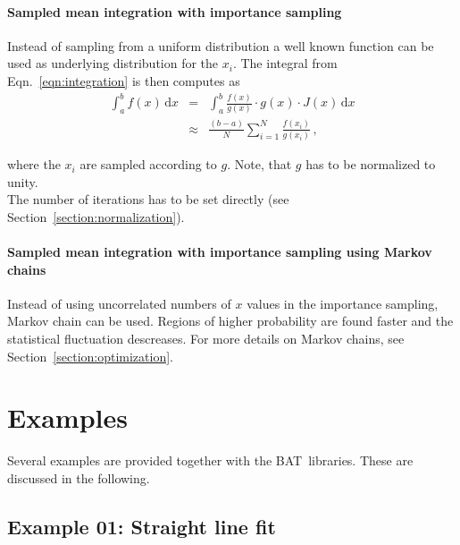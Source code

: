 \documentclass[11pt, a4paper]{article}
\newcommand{\BAT}{{\sc BAT}}
\begin{document}
\paragraph{Sampled mean integration with importance sampling} 

Instead of sampling from a uniform distribution a well known function
can be used as underlying distribution for the $x_{i}$. The integral
from Eqn.~\ref{eqn:integration} is then computes as 
%
\begin{eqnarray}
\int_{a}^{b} f(x) \, \mathrm{d}x & = & \int_{a}^{b} \frac{f(x)}{g(x)} \cdot g(x) \cdot J(x) \, \mathrm{d}x \\ 
 & \approx & \frac{(b - a)}{N} \sum_{i=1}^{N} \frac{f(x_{i})}{g(x_{i})} \, , 
\end{eqnarray} 

\noindent 
where the $x_{i}$ are sampled according to $g$. Note, that $g$ has to
be normalized to unity. \\ 

\noindent 
The number of iterations has to be set directly (see Section~\ref{section:normalization}). 

\paragraph{Sampled mean integration with importance sampling using Markov chains} 

Instead of using uncorrelated numbers of $x$ values in the importance
sampling, Markov chain can be used. Regions of higher probability are
found faster and the statistical fluctuation descreases. For more
details on Markov chains, see Section~\ref{section:optimization}.


\section{Examples}

Several examples are provided together with the \BAT\ libraries. These
are discussed in the following. 


\subsection{Example 01: Straight line fit} 
\end{document}
